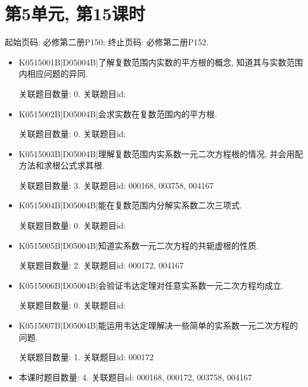 \section*{第5单元, 第15课时}
起始页码: 必修第二册P150; 终止页码: 必修第二册P152.
\begin{itemize}
\item K0515001B|D05004B|了解复数范围内实数的平方根的概念, 知道其与实数范围内相应问题的异同.

关联题目数量: 0. 关联题目id: 

\item K0515002B|D05004B|会求实数在复数范围内的平方根.

关联题目数量: 0. 关联题目id: 

\item K0515003B|D05004B|理解复数范围内实系数一元二次方程根的情况, 并会用配方法和求根公式求其根.

关联题目数量: 3. 关联题目id: 000168, 003758, 004167

\item K0515004B|D05004B|能在复数范围内分解实系数二次三项式.

关联题目数量: 0. 关联题目id: 

\item K0515005B|D05004B|知道实系数一元二次方程的共轭虚根的性质.

关联题目数量: 2. 关联题目id: 000172, 004167

\item K0515006B|D05004B|会验证韦达定理对任意实系数一元二次方程均成立.

关联题目数量: 0. 关联题目id: 

\item K0515007B|D05004B|能运用韦达定理解决一些简单的实系数一元二次方程的问题.

关联题目数量: 1. 关联题目id: 000172

\item 本课时题目数量: 4. 关联题目id: 000168, 000172, 003758, 004167

\end{itemize}

